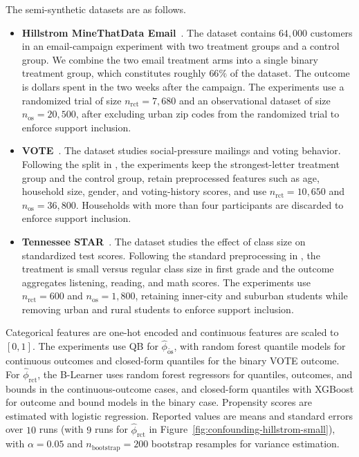 The semi-synthetic datasets are as follows.
\begin{itemize}
  \item \textbf{Hillstrom MineThatData Email}~\citep{hillstrom2008}. The dataset contains \(64{,}000\) customers in an email-campaign experiment with two treatment groups and a control group. We combine the two email treatment arms into a single binary treatment group, which constitutes roughly \(66\%\) of the dataset. The outcome is dollars spent in the two weeks after the campaign. The experiments use a randomized trial of size \(n_{\mathrm{rct}}=7{,}680\) and an observational dataset of size \(n_{\mathrm{os}}=20{,}500\), after excluding urban zip codes from the randomized trial to enforce support inclusion.
  \item \textbf{VOTE}~\citep{gerber2008social}. The dataset studies social-pressure mailings and voting behavior. Following the split in \citet{stutz2023}, the experiments keep the strongest-letter treatment group and the control group, retain preprocessed features such as age, household size, gender, and voting-history scores, and use \(n_{\mathrm{rct}}=10{,}650\) and \(n_{\mathrm{os}}=36{,}800\). Households with more than four participants are discarded to enforce support inclusion.
  \item \textbf{Tennessee STAR}~\citep{word1990state}. The dataset studies the effect of class size on standardized test scores. Following the standard preprocessing in \citet{kallus2018removing}, the treatment is small versus regular class size in first grade and the outcome aggregates listening, reading, and math scores. The experiments use \(n_{\mathrm{rct}}=600\) and \(n_{\mathrm{os}}=1{,}800\), retaining inner-city and suburban students while removing urban and rural students to enforce support inclusion.
\end{itemize}
Categorical features are one-hot encoded and continuous features are scaled to \([0,1]\). The experiments use QB \citep{dorn2022sharp} for \(\widehat{\phi}_{\widetilde{\mathrm{os}}}\), with random forest quantile models for continuous outcomes and closed-form quantiles for the binary VOTE outcome. For \(\widehat{\phi}_{\mathrm{rct}}\), the B-Learner uses random forest regressors for quantiles, outcomes, and bounds in the continuous-outcome cases, and closed-form quantiles with XGBoost \citep{chen2015xgboost} for outcome and bound models in the binary case. Propensity scores are estimated with logistic regression. Reported values are means and standard errors over \(10\) runs (with \(9\) runs for \(\widehat{\phi}_{\mathrm{rct}}\) in Figure~\ref{fig:confounding-hillstrom-small}), with \(\alpha=0.05\) and \(n_{\mathrm{bootstrap}}=200\) bootstrap resamples for variance estimation.

